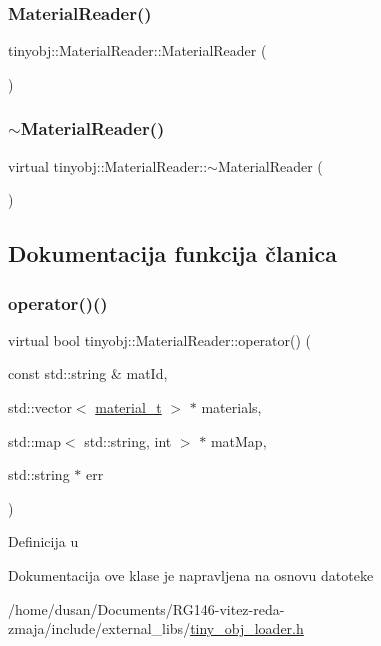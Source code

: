 \subsubsection{\texorpdfstring{Material\+Reader()}{MaterialReader()}}
{\footnotesize\ttfamily tinyobj\+::\+Material\+Reader\+::\+Material\+Reader (\begin{DoxyParamCaption}{ }\end{DoxyParamCaption})\hspace{0.3cm}{\ttfamily [inline]}}

\mbox{\label{classtinyobj_1_1MaterialReader_afd62ceccd9b373801226e037ea1a5f9f}} 
\subsubsection{\texorpdfstring{$\sim$\+Material\+Reader()}{~MaterialReader()}}
{\footnotesize\ttfamily virtual tinyobj\+::\+Material\+Reader\+::$\sim$\+Material\+Reader (\begin{DoxyParamCaption}{ }\end{DoxyParamCaption})\hspace{0.3cm}{\ttfamily [virtual]}}



\subsection{Dokumentacija funkcija članica}
\mbox{\label{classtinyobj_1_1MaterialReader_ad165d8cc1bd989f8548a9258b0881a89}} 
\subsubsection{\texorpdfstring{operator()()}{operator()()}}
{\footnotesize\ttfamily virtual bool tinyobj\+::\+Material\+Reader\+::operator() (\begin{DoxyParamCaption}\item[{const std\+::string \&}]{mat\+Id,  }\item[{std\+::vector$<$ \hyperlink{structtinyobj_1_1material__t}{material\+\_\+t} $>$ $\ast$}]{materials,  }\item[{std\+::map$<$ std\+::string, int $>$ $\ast$}]{mat\+Map,  }\item[{std\+::string $\ast$}]{err }\end{DoxyParamCaption})\hspace{0.3cm}{\ttfamily [pure virtual]}}



Definicija u 



Dokumentacija ove klase je napravljena na osnovu datoteke \begin{DoxyCompactItemize}
\item 
/home/dusan/\+Documents/\+R\+G146-\/vitez-\/reda-\/zmaja/include/external\+\_\+libs/\hyperlink{tiny__obj__loader_8h}{tiny\+\_\+obj\+\_\+loader.\+h}\end{DoxyCompactItemize}
